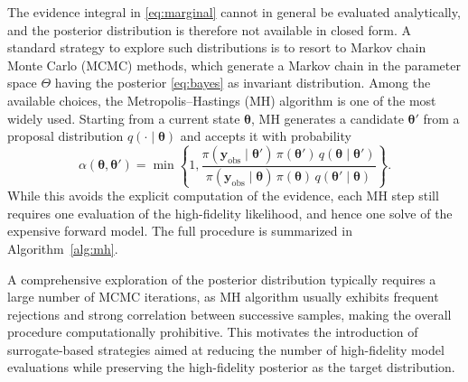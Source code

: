 \documentclass{elsarticle}
\begin{document}
The evidence integral in \eqref{eq:marginal} cannot in general be evaluated analytically, and the posterior distribution is therefore not available in closed form. A standard strategy to explore such distributions is to resort to Markov chain Monte Carlo (MCMC) methods, which generate a Markov chain in the parameter space $\Theta$ having the posterior \eqref{eq:bayes} as invariant distribution. Among the available choices, the Metropolis--Hastings (MH) algorithm is one of the most widely used. Starting from a current state $\boldsymbol{\theta}$, MH generates a candidate $\boldsymbol{\theta}'$ from a proposal distribution $q(\cdot\mid\boldsymbol{\theta})$ and accepts it with probability
\begin{equation}
\label{eq:mh-acceptance}
    \alpha(\boldsymbol{\theta},\boldsymbol{\theta}')
    =
    \min\left\{
    1,
    \frac{
    \pi(\mathbf y_{\mathrm{obs}}\mid \boldsymbol{\theta}')\,
    \pi(\boldsymbol{\theta}')\,
    q(\boldsymbol{\theta}\mid\boldsymbol{\theta}')
    }{
    \pi(\mathbf y_{\mathrm{obs}}\mid \boldsymbol{\theta})\,
    \pi(\boldsymbol{\theta})\,
    q(\boldsymbol{\theta}'\mid\boldsymbol{\theta})
    }
    \right\}.
\end{equation}
While this avoids the explicit computation of the evidence, each MH step still requires one evaluation of the high-fidelity likelihood, and hence one solve of the expensive forward model. The full procedure is summarized in Algorithm~\ref{alg:mh}. 

A comprehensive exploration of the posterior distribution typically requires a large number of MCMC iterations, as MH algorithm usually exhibits frequent rejections and strong correlation between successive samples, making the overall procedure computationally prohibitive. This motivates the introduction of surrogate-based strategies aimed at reducing the number of high-fidelity model evaluations while preserving the high-fidelity posterior as the target distribution.
\end{document}
